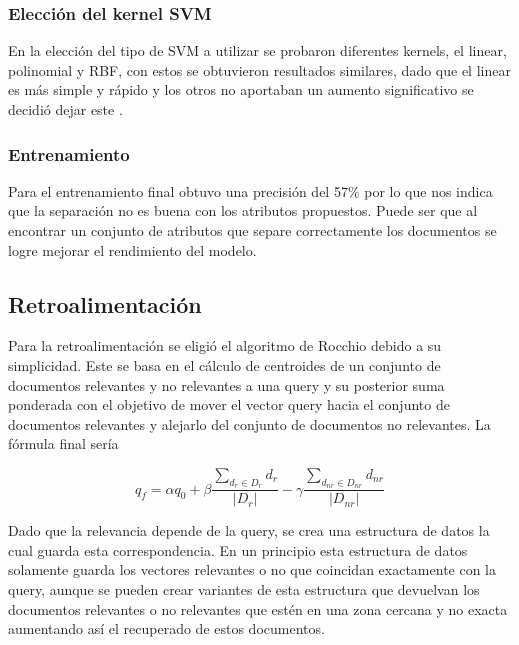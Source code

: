 \documentclass[runningheads]{llncs}
\begin{document}
\subsubsection{Elección del kernel SVM}

En la elección del tipo de SVM a utilizar se probaron diferentes kernels, el linear, polinomial y RBF, con estos
se obtuvieron resultados similares, dado que el linear es más simple y rápido y los otros no aportaban un aumento
significativo se decidió dejar este \cite{svmSklearn}.

\subsubsection{Entrenamiento}

Para el entrenamiento final obtuvo una precisión del 57\% por lo que nos indica que la separación no es buena con
los atributos propuestos. Puede ser que al encontrar un conjunto de atributos que separe correctamente los documentos
se logre mejorar el rendimiento del modelo.

\subsection{Retroalimentación}

Para la retroalimentación se eligió el algoritmo de Rocchio debido a su simplicidad. Este se basa 
en el cálculo de centroides de un conjunto de documentos relevantes y no relevantes a una query
y su posterior suma ponderada con el objetivo de mover el vector query hacia el conjunto de 
documentos relevantes y alejarlo del conjunto de documentos no relevantes. La fórmula final sería

\begin{equation}
    q_f = \alpha q_0 + \beta \frac{\sum_{d_r \in D_r} d_r}{|D_r|} - \gamma \frac{\sum_{d_{nr} \in D_{nr}} d_{nr}}{|D_{nr}|} 
\end{equation}

Dado que la relevancia depende de la query, se crea una estructura de datos la cual guarda esta correspondencia. 
En un principio esta estructura de datos solamente guarda los vectores relevantes o no que coincidan exactamente
con la query, aunque se pueden crear variantes de esta estructura que devuelvan los documentos relevantes o no
relevantes que estén en una zona cercana y no exacta aumentando así el recuperado de estos documentos.
\end{document}
